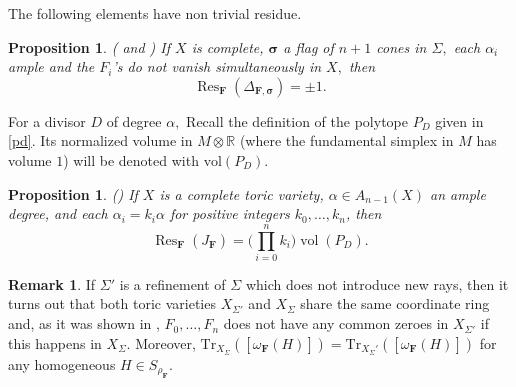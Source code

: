 \documentclass[a4paper,11pt]{amsart}
\newcommand{\vol}{\operatorname{vol}}
\newcommand{\Res}{\operatorname{Res}}
\newcommand{\R}{\mathbb{R}}
\newcommand{\bfsigma}{{\boldsymbol{\sigma}}}
\newcommand{\bfF}{{\boldsymbol{F}}}
\newcounter{thm}
\numberwithin{thm}{section}
\numberwithin{equation}{section}
\theoremstyle{definition}
\newtheorem{remark}[thm]{Remark}
\theoremstyle{plain}
\newtheorem{proposition}[thm]{Proposition}
\begin{document}
The following elements have non trivial residue.
\begin{proposition}\label{deta}(\cite[Theorem 0.2]{CCD97} and \cite[Theorem 2.1]{DK05})
If $X$ is complete, $\bfsigma$ a flag of $n+1$ cones in $\Sigma,$ each $\alpha_i$ ample and the $F_i$'s do not vanish simultaneously in $X,$ then
$$\Res_\bfF(\Delta_{\bfF,\bfsigma})=\pm1.
$$
\end{proposition}
For a divisor $D$ of degree $\alpha,$ Recall the definition of the polytope $P_D$ given in \eqref{pd}. 
Its  normalized volume in $M\otimes\R$ (where the fundamental simplex in $M$ has volume $1$) will be denoted with $\mbox{vol}(P_D).$
\begin{proposition}\label{jaobian}(\cite[Theorem 1]{CD97})
If $X$ is a complete toric variety, $\alpha\in A_{n-1}(X)$ an ample degree, and each $\alpha_i=k_i\alpha$ for positive integers $k_0,\ldots, k_n$, then
\begin{equation}\label{D}
\Res_\bfF(J_\bfF)=\Big(\prod_{i=0}^nk_i\Big)\vol(P_D).
\end{equation}
\end{proposition}

\begin{remark}\label{desing}
If $\Sigma'$ is a refinement of $\Sigma$ which does not introduce new rays, then it turns out that both toric varieties $X_{\Sigma'}$ and $X_\Sigma$ share the same coordinate ring and, as it was shown in  \cite[Proposition $2.1$]{KS05},
$F_0,\ldots, F_n$ does not have any common zeroes in $X_{\Sigma'}$ if this happens in $X_\Sigma.$ Moreover,  $\mbox{Tr}_{X_\Sigma}([\omega_\bfF(H)])=  \mbox{Tr}_{X_\Sigma'}([\omega_\bfF(H)])$ for any homogeneous $H\in S_{\rho_\bfF}.$ 
\end{remark}





\medskip
\end{document}
